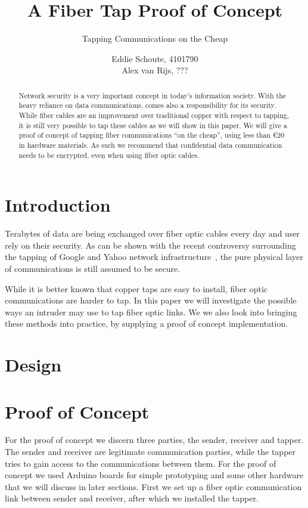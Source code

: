 \documentclass[11pt,twoside,a4paper]{scrartcl}
\title{A Fiber Tap Proof of Concept}
\subtitle{Tapping Communications on the Cheap}
\author{
		Eddie Schoute, 4101790\\
		Alex van Rijs, ???
	}
\begin{document}
\maketitle

\begin{abstract}
	\noindent Network security is a very important concept in today's information society.
	With the heavy reliance on data communications, comes also a responsibility for its security.
	While fiber cables are an improvement over traditional copper with respect to tapping,
	it is still very possible to tap these cables as we will show in this paper.
	We will give a proof of concept of tapping fiber communications ``on the cheap'',
	using less than \euro{}$20$ in hardware materials.
	As such we recommend that confidential data communication needs to be encrypted,
	even when using fiber optic cables.
\end{abstract}

\section{Introduction}
	Terabytes of data are being exchanged over fiber optic cables every day and user rely on their security.
	As can be shown with the recent controversy surrounding the tapping of Google and Yahoo network infrastructure~\cite{googleyahootap},
	the pure physical layer of communications is still assumed to be secure.

	While it is better known that copper taps are easy to install, fiber optic communications are harder to tap.
	In this paper we will investigate the possible ways an intruder may use to tap fiber optic links.
	We we also look into bringing these methods into practice, by supplying a proof of concept implementation.

\section{Design}

\section{Proof of Concept}
	For the proof of concept we discern three parties, the sender, receiver and tapper.
	The sender and receiver are legitimate communication parties,
	while the tapper tries to gain access to the communications between them.
	For the proof of concept we used Arduino boards for simple prototyping and some other hardware
	that we will discuss in later sections.
	First we set up a fiber optic communication link between sender and receiver,
	after which we installed the tapper.
\end{document}

